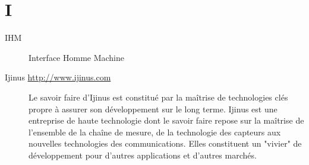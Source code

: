 \section{I}

\begin{description}

\item[IHM] Interface Homme Machine
\item[Ijinus \url{http://www.ijinus.com}]
        Le savoir faire d’Ijinus est constitué par la maîtrise de technologies clés propre à assurer son développement sur le long terme.
Ijinus est une entreprise de haute technologie dont le savoir faire repose sur la maîtrise de l’ensemble de la chaîne de mesure, de la technologie des capteurs aux nouvelles technologies des communications.
Elles constituent un "vivier" de développement pour d'autres applications et d'autres marchés.
\end{description}

